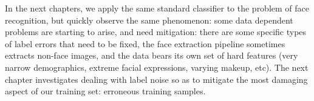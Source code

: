 In the next chapters, we apply the same standard classifier to the problem of face recognition, but quickly observe the same phenomenon: some data dependent problems are starting to arise, and need mitigation: there are some specific types of label errors that need to be fixed, the face extraction pipeline sometimes extracts non-face images, and the data bears its own set of hard features (very narrow demographics, extreme facial expressions, varying makeup, etc). The next chapter investigates dealing with label noise so as to mitigate the most damaging aspect of our training set: erroneous training samples.